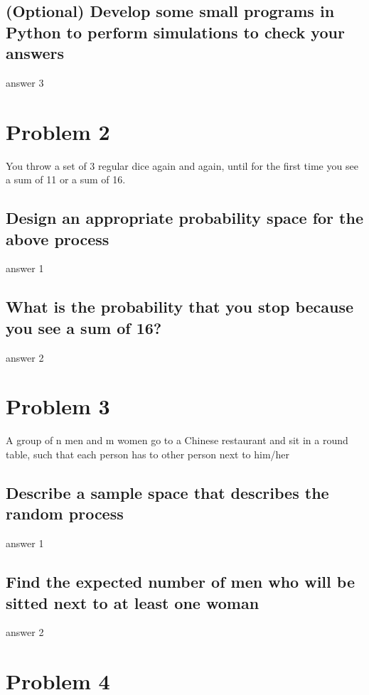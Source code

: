 \documentclass[oneside]{article}			%
\begin{document}
	\subsection{(Optional) Develop some small programs in Python to perform simulations to check your answers} answer 3
	
	
	\clearpage				%
	\setcounter{section}{2}		%
	\setcounter{subsection}{0}		%
	\section*{Problem 2} 
	You throw a set of 3 regular dice again and again, until for the first time you see a sum of 11 or a sum of 16.
	\subsection{Design an appropriate probability space for the above process}
	answer 1		%
	\subsection{What is the probability that you stop because you see a sum of 16?}
	answer 2		%


	\clearpage				%
	\setcounter{section}{3}		%
	\setcounter{subsection}{0}		%
	\section*{Problem 3} 
	A group of n men and m women go to a Chinese restaurant and sit in a round table, such that each person has to other person next to him/her
	\subsection{Describe a sample space that describes the random process}
	answer 1		%
	\subsection{Find the expected number of men who will be sitted next to at least one woman}
	answer 2		%
		
		
	\clearpage				%
	\setcounter{section}{4}		%
	\setcounter{subsection}{0}		%
	\section*{Problem 4} 
\end{document}
